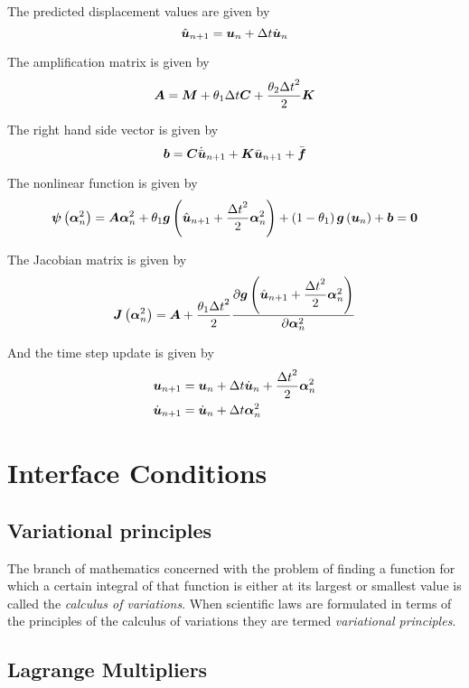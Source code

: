The predicted displacement values are given by
\begin{equation}
   \hat{\vect{u}}_{n+1} = \vect{u}_{n}+\Delta t\dot{\vect{u}}_{n}
\end{equation}

The amplification matrix is given by
\begin{equation}
  \matr{A}=\matr{M}+\theta_{1}\Delta t\matr{C}+\dfrac{\theta_{2}{\Delta t}^{2}}{2}\matr{K}
\end{equation}

The right hand side vector is given by
\begin{equation}
  \vect{b}=\matr{C}\dot{\bar{\vect{u}}}_{n+1}+\matr{K}\bar{\vect{u}}_{n+1}+\bar{\vect{f}}
\end{equation}

The nonlinear function is given by
\begin{equation}
  \fnof{\vect{\psi}}{\vect{\alpha}^{2}_{n}}=\matr{A}\vect{\alpha}^{2}_{n}+\theta_{1}\fnof{\vect{g}}{\hat{\vect{u}}_{n+1}+ 
    \dfrac{{\Delta t}^{2}}{2}\vect{\alpha}^{2}_{n}}+\pbrac{1-\theta_{1}}\fnof{\vect{g}}{\vect{u}_{n}}+\vect{b}=\vect{0}
\end{equation}

The Jacobian matrix is given by
\begin{equation}
  \fnof{\matr{J}}{\vect{\alpha}^{2}_{n}}=\matr{A}+\dfrac{\theta_{1}{\Delta t}^{2}}{2}
  \delby{\fnof{\vect{g}}{{\hat{\vect{u}}_{n+1}+\dfrac{{\Delta t}^{2}}{2}\vect{\alpha}^{2}_{n}}}}{\vect{\alpha}^{2}_{n}}
\end{equation}

And the time step update is given by
\begin{equation}
  \begin{split}
    \vect{u}_{n+1} &= \vect{u}_{n}+\Delta t\dot{\vect{u}}_{n} +\dfrac{{\Delta t}^{2}}{2}\vect{\alpha}^{2}_{n} \\
    \dot{\vect{u}}_{n+1} &= \dot{\vect{u}}_{n}+\Delta t\vect{\alpha}^{2}_{n} 
  \end{split}
\end{equation}

\section{Interface Conditions}

\subsection{Variational principles}

The branch of mathematics concerned with the problem of finding a function for
which a certain integral of that function is either at its largest or smallest
value is called the \emph{calculus of variations}. When scientific laws are formulated in terms of the principles of the calculus
of variations they are termed \emph{variational principles}. 

\subsection{Lagrange Multipliers}

